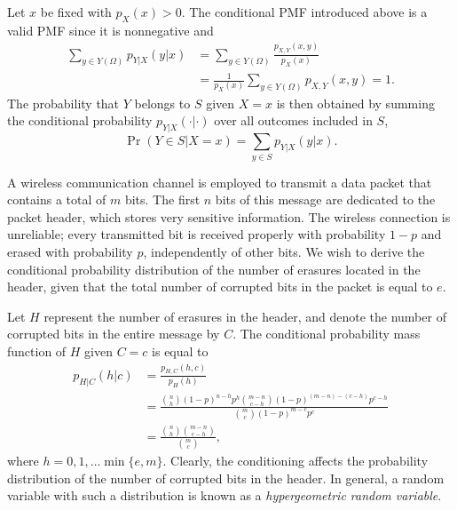 Let $x$ be fixed with $p_X (x) > 0$.
The conditional PMF introduced above is a valid PMF since it is nonnegative and
\begin{equation*}
\begin{split}
\sum_{y \in Y(\Omega)} p_{Y|X} (y|x)
&= \sum_{y \in Y(\Omega)} \frac{p_{X,Y} (x,y)}{p_X (x)} \\
&= \frac{1}{p_X (x)} \sum_{y \in Y(\Omega)} p_{X,Y} (x,y) = 1.
\end{split}
\end{equation*}
The probability that $Y$ belongs to $S$ given $X = x$ is then obtained by summing the conditional probability $p_{Y|X} (\cdot | \cdot)$ over all outcomes included in $S$,
\begin{equation*}
\Pr (Y \in S | X = x) = \sum_{y \in S} p_{Y|X} (y | x) .
\end{equation*}

\begin{example}
A wireless communication channel is employed to transmit a data packet that contains a total of $m$ bits.
The first $n$ bits of this message are dedicated to the packet header, which stores very sensitive information.
The wireless connection is unreliable; every transmitted bit is received properly with probability $1-p$ and erased with probability $p$, independently of other bits.
We wish to derive the conditional probability distribution of the number of erasures located in the header, given that the total number of corrupted bits in the packet is equal to $e$.

Let $H$ represent the number of erasures in the header, and denote the number of corrupted bits in the entire message by $C$.
The conditional probability mass function of $H$ given $C = c$ is equal to
\begin{equation*}
\begin{split}
p_{H|C} (h|c) &= \frac{p_{H,C} (h,c)}{p_H (h)} \\
&= \frac{\binom{n}{h} (1-p)^{n-h} p^h
\binom{m-n}{c-h} (1-p)^{(m-n)-(c-h)} p^{c - h}}{\binom{m}{c} (1-p)^{m-c} p^c} \\
&= \frac{\binom{n}{h} \binom{m-n}{c-h}}{\binom{m}{c}} ,
\end{split}
\end{equation*}
where $h = 0, 1, \ldots \min \{ e, m \}$.
Clearly, the conditioning affects the probability distribution of the number of corrupted bits in the header.
In general, a random variable with such a distribution is known as a \emph{hypergeometric random variable}. 
\end{example}

